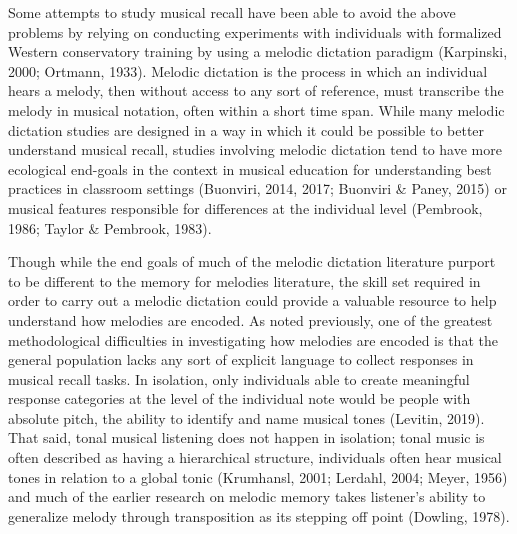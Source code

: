 \documentclass[english,man,floatsintext]{apa6}
\begin{document}
Some attempts to study musical recall have been able to avoid the above problems by relying on conducting experiments with individuals with formalized Western conservatory training by using a melodic dictation paradigm (Karpinski, 2000; Ortmann, 1933).
Melodic dictation is the process in which an individual hears a melody, then without access to any sort of reference, must transcribe the melody in musical notation, often within a short time span.
While many melodic dictation studies are designed in a way in which it could be possible to better understand musical recall, studies involving melodic dictation tend to have more ecological end-goals in the context in musical education for understanding best practices in classroom settings (Buonviri, 2014, 2017; Buonviri \& Paney, 2015) or musical features responsible for differences at the individual level (Pembrook, 1986; Taylor \& Pembrook, 1983).

Though while the end goals of much of the melodic dictation literature purport to be different to the memory for melodies literature, the skill set required in order to carry out a melodic dictation could provide a valuable resource to help understand how melodies are encoded.
As noted previously, one of the greatest methodological difficulties in investigating how melodies are encoded is that the general population lacks any sort of explicit language to collect responses in musical recall tasks.
In isolation, only individuals able to create meaningful response categories at the level of the individual note would be people with absolute pitch, the ability to identify and name musical tones (Levitin, 2019).
That said, tonal musical listening does not happen in isolation; tonal music is often described as having a hierarchical structure, individuals often hear musical tones in relation to a global tonic (Krumhansl, 2001; Lerdahl, 2004; Meyer, 1956) and much of the earlier research on melodic memory takes listener's ability to generalize melody through transposition as its stepping off point (Dowling, 1978).
\end{document}
